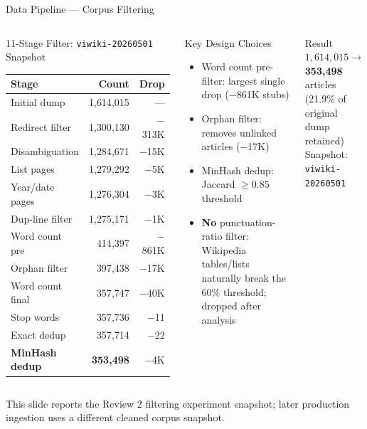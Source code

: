 \documentclass[aspectratio=169]{beamer}
\newcommand{\pos}[1]{\textcolor{positive}{#1}}
\begin{document}
\begin{frame}[shrink=15]{Data Pipeline --- Corpus Filtering}
\begin{columns}[T]
\begin{block}{11-Stage Filter: \texttt{viwiki-20260501} Snapshot}
\begin{tabular}{@{}lrr@{}}
\toprule
\textbf{Stage} & \textbf{Count} & \textbf{Drop} \\
\midrule
Initial dump        & 1{,}614{,}015 & --- \\
Redirect filter     & 1{,}300{,}130 & $-$313K \\
Disambiguation      & 1{,}284{,}671 & $-$15K \\
List pages          & 1{,}279{,}292 & $-$5K \\
Year/date pages     & 1{,}276{,}304 & $-$3K \\
Dup-line filter     & 1{,}275{,}171 & $-$1K \\
Word count pre      &   414{,}397 & $-$861K \\
Orphan filter       &   397{,}438 & $-$17K \\
Word count final    &   357{,}747 & $-$40K \\
Stop words          &   357{,}736 & $-$11 \\
Exact dedup         &   357{,}714 & $-$22 \\
\textbf{MinHash dedup} & \textbf{353{,}498} & $-$4K \\
\bottomrule
\end{tabular}
\end{block}

\begin{exampleblock}{Key Design Choices}
\begin{itemize}\scriptsize\setlength\itemsep{2pt}
  \item Word count pre-filter: largest single drop ($-$861K stubs)
  \item Orphan filter: removes unlinked articles ($-$17K)
  \item MinHash dedup: Jaccard $\geq 0.85$ threshold
  \item \textbf{No} punctuation-ratio filter: Wikipedia tables/lists naturally break the 60\% threshold; dropped after analysis
\end{itemize}
\end{exampleblock}

\begin{block}{Result}
{\small $1{,}614{,}015 \rightarrow$ \pos{\textbf{353{,}498}} articles\\
(21.9\% of original dump retained)\\
Snapshot: \texttt{viwiki-20260501}}
\end{block}
\end{columns}
\vspace{2pt}
{\scriptsize This slide reports the Review 2 filtering experiment snapshot; later production ingestion uses a different cleaned corpus snapshot.}
\end{frame}
\end{document}

